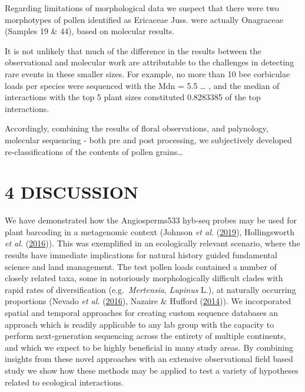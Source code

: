 \documentclass[
]{article}
\begin{document}
Regarding limitations of morphological data we suspect that there were
two morphotypes of pollen identified as Ericaceae Juss. were actually
Onagraceae (Samples 19 \& 44), based on molecular results.

It is not unlikely that much of the difference in the results between
the observational and molecular work are attributable to the challenges
in detecting rare events in these smaller sizes. For example, no more
than 10 bee corbiculae loads per species were sequenced with the Mdn =
5.5 \ldots{} , and the median of interactions with the top 5 plant sizes
constituted 0.8283385 of the top interactions.

Accordingly, combining the results of floral observations, and
palynology, molecular sequencing - both pre and post processing, we
subjectively developed re-classifications of the contents of pollen
grains\ldots{}

\hypertarget{discussion}{%
\section{4 \textbar{} DISCUSSION}\label{discussion}}

We have demonstrated how the Angiosperms533 hyb-seq probes may be used
for plant barcoding in a metagenomic context (Johnson \emph{et al.}
(\protect\hyperlink{ref-johnson2019universal}{2019}), Hollingsworth
\emph{et al.} (\protect\hyperlink{ref-hollingsworth2016telling}{2016})).
This was exemplified in an ecologically relevant scenario, where the
results have immediate implications for natural history guided
fundamental science and land management. The test pollen loads contained
a number of closely related taxa, some in notoriously morphologically
difficult clades with rapid rates of diversification
(e.g.~\emph{Mertensia}, \emph{Lupinus} L.), at naturally occurring
proportions (Nevado \emph{et al.}
(\protect\hyperlink{ref-nevado2016widespread}{2016}), Nazaire \& Hufford
(\protect\hyperlink{ref-nazaire2014phylogenetic}{2014})). We
incorporated spatial and temporal approaches for creating custom
sequence databases an approach which is readily applicable to any lab
group with the capacity to perform next-generation sequencing across the
entirety of multiple continents, and which we expect to be highly
beneficial in many study areas. By combining insights from these novel
approaches with an extensive observational field based study we show how
these methods may be applied to test a variety of hypotheses related to
ecological interactions.
\end{document}

